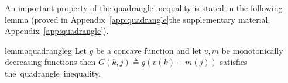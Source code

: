 \documentclass[11pt,letterpaper]{article}
\newtheorem{lemma}{Lemma}
\newcommand{\parentheses}[1]{\left(#1\right)}
\newcommand{\appendixlocation}[1]{\ifarxiv Appendix~\ref{#1}\else the supplementary material, Appendix~\ref{#1}\fi}
\begin{document}
An important property of the quadrangle inequality is stated in the following lemma (proved in \appendixlocation{app:quadrangle}).

\begin{restatable}{lemma}{quadrangleg}\label{lem:quadrangle_g}
    Let $g$ be a concave function and let $v, m$ be monotonically decreasing functions then $G(k,j)\triangleq g(v(k)+m(j))$ satisfies \mbox{the quadrangle inequality.}
\end{restatable}


%
%
%
\end{document}
